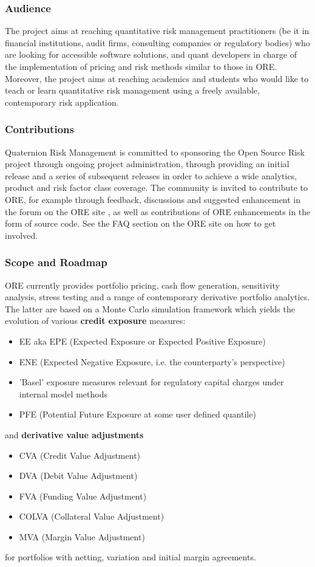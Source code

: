 \documentclass[12pt, a4paper]{article}
\begin{document}
\subsubsection*{Audience}
The project aims at reaching quantitative risk ma\-nage\-ment practitioners (be it in financial institutions, audit
firms, consulting companies or regulatory bodies) who are looking for accessible software solutions, and quant
developers in charge of the implementation of pricing and risk methods similar to those in ORE. Moreover, the project
aims at reaching academics and students who would like to teach or learn quantitative risk management using a freely
available, contemporary risk application.

\subsubsection*{Contributions}
Quaternion Risk Management \cite{QRM} is committed to sponsoring the Open Source Risk project through ongoing project
administration, through providing an initial release and a series of subsequent releases in order to achieve a wide
analytics, product and risk factor class coverage. The community is invited to contribute to ORE, for example through
feedback, discussions and suggested enhancement in the forum on the ORE site \cite{ORE}, as well as contributions of ORE
enhancements in the form of source code. See the FAQ section on the ORE site \cite{ORE} on how to get involved.

\subsubsection*{Scope and Roadmap}

ORE currently provides portfolio pricing, cash flow generation, sensitivity analysis, stress testing and a range of contemporary derivative portfolio analytics. The latter are based on a Monte Carlo simulation framework which yields 
the evolution of various {\bf credit exposure} measures:
\begin{itemize}
\item EE aka EPE (Expected Exposure or Expected Positive Exposure)
\item ENE (Expected Negative Exposure, i.e. the counterparty's perspective)
\item 'Basel' exposure measures relevant for regulatory capital charges under internal model methods 
\item PFE (Potential Future Exposure at some user defined quantile)
\end{itemize}
and {\bf derivative value adjustments}
\begin{itemize}
\item CVA (Credit Value Adjustment)
\item DVA (Debit Value Adjustment)
\item FVA (Funding Value Adjustment)
\item COLVA (Collateral Value Adjustment)
\item MVA (Margin Value Adjustment)
\end{itemize}
for portfolios with netting, variation and initial margin agreements. 
\end{document}

